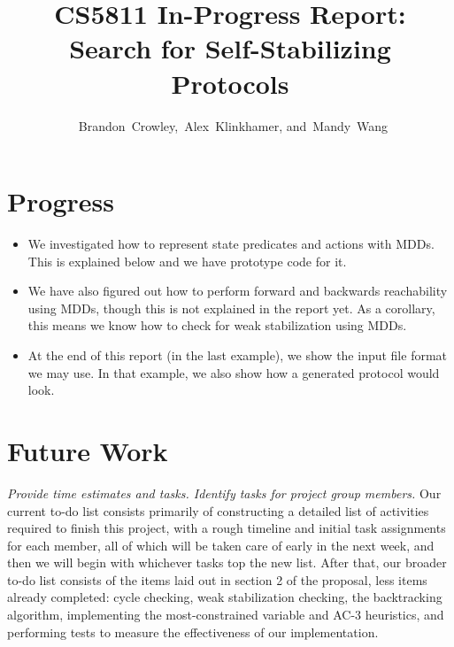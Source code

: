 


\usepackage{tikz}
\usetikzlibrary{arrows}
\usepackage{listings}



\title{
 CS5811 In-Progress Report:\\
 Search for Self-Stabilizing Protocols
}

\author{~Brandon~Crowley,~Alex~Klinkhamer, and~Mandy~Wang}
\maketitle




\section{Progress}

\begin{itemize}
 \item We investigated how to represent state predicates and actions with MDDs.
  This is explained below and we have prototype code for it.
 \item We have also figured out how to perform forward and backwards reachability using MDDs, though this is not explained in the report yet.
  As a corollary, this means we know how to check for weak stabilization using MDDs.
 \item At the end of this report (in the last example), we show the input file format we may use.
  In that example, we also show how a generated protocol would look.
\end{itemize}

\section{Future Work}

{\it Provide time estimates and tasks. Identify tasks for project group members.}
Our current to-do list consists primarily of constructing a detailed list of activities required to finish this project, with a rough timeline 
and initial task assignments for each member, all of which will be taken care of early in the next week, and then we will begin with whichever tasks top
the new list.  After that, our broader to-do list consists of the items laid out in section 2 of the proposal, less items already completed:
cycle checking, weak stabilization checking, the backtracking algorithm, implementing the most-constrained variable and AC-3 heuristics, and performing
tests to measure the effectiveness of our implementation.

